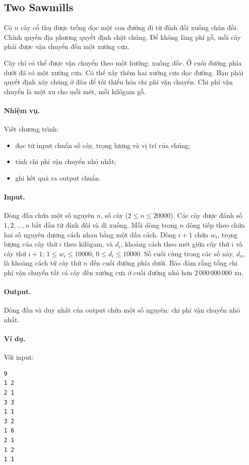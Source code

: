 \documentclass[11pt]{article}
\begin{document}
\subsection{Two Sawmills}

Có $n$ cây cổ thụ được trồng dọc một con đường đi từ đỉnh đồi xuống chân đồi.
Chính quyền địa phương quyết định chặt chúng. Để không lãng phí gỗ, mỗi cây
phải được vận chuyển đến một xưởng cưa.

Cây chỉ có thể được vận chuyển theo một hướng: xuống dốc. Ở cuối đường phía
dưới đã có một xưởng cưa. Có thể xây thêm hai xưởng cưa dọc đường. Bạn phải
quyết định xây chúng ở đâu để tối thiểu hóa chi phí vận chuyển. Chi phí vận
chuyển là một xu cho mỗi mét, mỗi kilôgam gỗ.

\paragraph{Nhiệm vụ.}
Viết chương trình:
\begin{itemize}
  \item đọc từ input chuẩn số cây, trọng lượng và vị trí của chúng;
  \item tính chi phí vận chuyển nhỏ nhất;
  \item ghi kết quả ra output chuẩn.
\end{itemize}

\paragraph{Input.}
Dòng đầu chứa một số nguyên $n$, số cây ($2\le n\le 20000$). Các cây được
đánh số $1,2,\ldots,n$ bắt đầu từ đỉnh đồi và đi xuống. Mỗi dòng trong $n$
dòng tiếp theo chứa hai số nguyên dương cách nhau bằng một dấu cách. Dòng
$i+1$ chứa $w_i$, trọng lượng của cây thứ $i$ theo kilôgam, và $d_i$, khoảng
cách theo mét giữa cây thứ $i$ và cây thứ $i+1$; $1\le w_i\le 10000$,
$0\le d_i\le 10000$. Số cuối cùng trong các số này, $d_n$, là khoảng cách từ
cây thứ $n$ đến cuối đường phía dưới. Bảo đảm rằng tổng chi phí vận chuyển
tất cả cây đến xưởng cưa ở cuối đường nhỏ hơn $2\,000\,000\,000$ xu.

\paragraph{Output.}
Dòng đầu và duy nhất của output chứa một số nguyên: chi phí vận chuyển nhỏ
nhất.

\paragraph{Ví dụ.}
Với input:
\begin{verbatim}
9
1 2
2 1
3 3
1 1
3 2
1 6
2 1
1 2
1 1
\end{verbatim}
\end{document}

